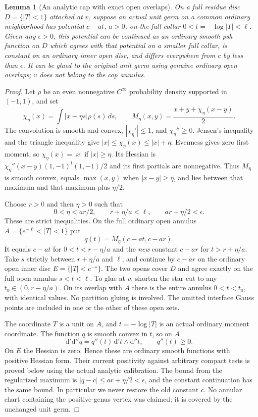 \documentclass[11pt]{article}
\newtheorem{lemma}[theorem]{Lemma}
\newcommand{\ddc}{\mathrm{d}'\mathrm{d}''}
\begin{document}
\begin{lemma}[An analytic cap with exact open overlaps]\label{lem:cap}
On a full residue disc $D=\{|T|<1\}$ attached at $v$, suppose
an actual unit germ on a common ordinary neighborhood has potential
$c-a t$, $a>0$, on the full collar $0<t=-\log|T|<\ell$.
Given any $\epsilon>0$, this potential can be continued as an
ordinary smooth psh function on $D$ which agrees with that potential
on a smaller full collar, is constant on an ordinary inner open
disc, and differs everywhere from $c$ by less than $\epsilon$.
It can be glued to the original unit germ using genuine ordinary
open overlaps; $v$ does not belong to the cap annulus.
\end{lemma}
\begin{proof}
Let $\rho$ be an even nonnegative $C^\infty$ probability density
supported in $(-1,1)$, and set
\[
 \chi_\eta(x)=\int |x-\eta s|\rho(s)\,ds,
 \qquad M_\eta(x,y)=\frac{x+y+\chi_\eta(x-y)}2.
\]
The convolution is smooth and convex, $|\chi_\eta'|\leq1$,
and $\chi_\eta''\geq0$. Jensen's inequality and the triangle
inequality give
$|x|\leq\chi_\eta(x)\leq|x|+\eta$.
Evenness gives zero first moment, so $\chi_\eta(x)=|x|$ if
$|x|\geq\eta$. Its Hessian is
$\chi_\eta''(x-y)(1,-1)^{\mathsf t}(1,-1)/2$ and its first
partials are nonnegative. Thus $M_\eta$ is smooth convex,
equals $\max(x,y)$ when $|x-y|\geq\eta$, and lies between
that maximum and that maximum plus $\eta/2$.

Choose $r>0$ and then $\eta>0$ such that
\[
 0<\eta<ar/2,\qquad r+\eta/a<\ell,
 \qquad ar+\eta/2<\epsilon.
\]
These are strict inequalities. On the full ordinary open annulus
$A=\{e^{-\ell}<|T|<1\}$ put
\[
                 q(t)=M_\eta(c-at,c-ar).
\]
It equals $c-at$ for $0<t<r-\eta/a$ and the \emph{new}
constant $c-ar$ for $t>r+\eta/a$.
Take $s$ strictly between $r+\eta/a$ and $\ell$, and continue
by $c-ar$ on the ordinary open inner disc $E=\{|T|<e^{-s}\}$.
The two opens cover $D$ and agree exactly on the full open annulus
$s<t<\ell$. To glue at $v$, shorten the star cut to any
$t_0\in(0,r-\eta/a)$. On its overlap with $A$ there is the
entire annulus $0<t<t_0$, with identical values. No partition
gluing is involved. The omitted interface Gauss points are
included in one or the other of these open sets.

The coordinate $T$ is a unit on $A$, and $t=-\log|T|$ is
an actual ordinary moment coordinate. The function $q$ is
smooth convex in $t$, so on $A$
\[
                    \ddc q=q''(t)\,\mathrm{d}'t\wedge\mathrm{d}''t,
                    \qquad q''(t)\geq0.
\]
On $E$ the Hessian is zero. Hence these are ordinary smooth
functions with positive Hessian form. Their current positivity
against arbitrary compact tests is proved below using the actual
analytic calibration. The bound from the regularized maximum is
$|q-c|\leq ar+\eta/2<\epsilon$, and the constant continuation
has the same bound. In particular we never restore the old
constant $c$. No annular chart containing the positive-genus
vertex was claimed; it is covered by the unchanged unit germ.
\end{proof}
\end{document}
